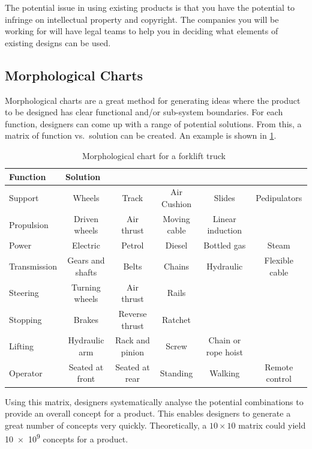 The potential issue in using existing products is that you have the potential to infringe on intellectual property and copyright.
The companies you will be working for will have legal teams to help you in deciding what elements of existing designs can be used.

\subsection{Morphological Charts}

Morphological charts are a great method for generating ideas where the product to be designed has clear functional and/or sub-system boundaries. For each function, designers can come up with a range of potential solutions.
From this, a matrix of function vs.\ solution can be created.
An example is shown in \cref{fig-morphological-chart}.


\begin{table}[h!]
    \centering
    \caption[Morphological chart for a forklift truck]{Morphological chart for a forklift truck~\citep{cross1989}}
    \label{fig-morphological-chart}
    \small
    \begin{tabular}{l | c c c c c}
        \toprule
        Function & \multicolumn{5}{l}{Solution} \\
        \midrule
        Support & Wheels & Track & Air Cushion & Slides & Pedipulators \\
        Propulsion & Driven wheels & Air thrust & Moving cable & Linear induction \\
        Power & Electric & Petrol & Diesel & Bottled gas & Steam \\
        Transmission & Gears and shafts & Belts & Chains & Hydraulic & Flexible cable \\
        Steering & Turning wheels & Air thrust & Rails & & \\
        Stopping & Brakes & Reverse thrust & Ratchet & & \\
        Lifting & Hydraulic arm & Rack and pinion & Screw & Chain or rope hoist & \\
        Operator & Seated at front & Seated at rear & Standing & Walking & Remote control \\
        \bottomrule
    \end{tabular}
    \vspace{2em}
\end{table}


Using this matrix, designers systematically analyse the potential combinations to provide an overall concept for a product.
This enables designers to generate a great number of concepts very quickly.
Theoretically, a \(10\times10\) matrix could yield \num{10e9} concepts for a product.



